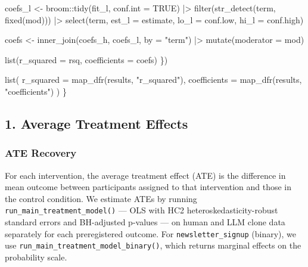 \documentclass[
  letterpaper,
  DIV=11,
  numbers=noendperiod]{scrartcl}
\newenvironment{Shaded}{\begin{snugshade}}{\end{snugshade}}
\newcommand{\AttributeTok}[1]{\textcolor[rgb]{0.40,0.45,0.13}{#1}}
\newcommand{\ConstantTok}[1]{\textcolor[rgb]{0.56,0.35,0.01}{#1}}
\newcommand{\FunctionTok}[1]{\textcolor[rgb]{0.28,0.35,0.67}{#1}}
\newcommand{\NormalTok}[1]{\textcolor[rgb]{0.00,0.23,0.31}{#1}}
\newcommand{\OtherTok}[1]{\textcolor[rgb]{0.00,0.23,0.31}{#1}}
\newcommand{\SpecialCharTok}[1]{\textcolor[rgb]{0.37,0.37,0.37}{#1}}
\newcommand{\StringTok}[1]{\textcolor[rgb]{0.13,0.47,0.30}{#1}}
\begin{document}
\begin{Shaded}
\begin{Highlighting}[]
\NormalTok{    coefs\_l }\OtherTok{\textless{}{-}}\NormalTok{ broom}\SpecialCharTok{::}\FunctionTok{tidy}\NormalTok{(fit\_l, }\AttributeTok{conf.int =} \ConstantTok{TRUE}\NormalTok{) }\SpecialCharTok{|\textgreater{}}
      \FunctionTok{filter}\NormalTok{(}\FunctionTok{str\_detect}\NormalTok{(term, }\FunctionTok{fixed}\NormalTok{(mod))) }\SpecialCharTok{|\textgreater{}}
      \FunctionTok{select}\NormalTok{(term, }\AttributeTok{est\_l =}\NormalTok{ estimate, }\AttributeTok{lo\_l =}\NormalTok{ conf.low, }\AttributeTok{hi\_l =}\NormalTok{ conf.high)}

\NormalTok{    coefs }\OtherTok{\textless{}{-}} \FunctionTok{inner\_join}\NormalTok{(coefs\_h, coefs\_l, }\AttributeTok{by =} \StringTok{"term"}\NormalTok{) }\SpecialCharTok{|\textgreater{}}
      \FunctionTok{mutate}\NormalTok{(}\AttributeTok{moderator =}\NormalTok{ mod)}

    \FunctionTok{list}\NormalTok{(}\AttributeTok{r\_squared =}\NormalTok{ rsq, }\AttributeTok{coefficients =}\NormalTok{ coefs)}
\NormalTok{  \})}

  \FunctionTok{list}\NormalTok{(}
    \AttributeTok{r\_squared    =} \FunctionTok{map\_dfr}\NormalTok{(results, }\StringTok{"r\_squared"}\NormalTok{),}
    \AttributeTok{coefficients =} \FunctionTok{map\_dfr}\NormalTok{(results, }\StringTok{"coefficients"}\NormalTok{)}
\NormalTok{  )}
\NormalTok{\}}
\end{Highlighting}
\end{Shaded}

\subsection{1. Average Treatment
Effects}\label{average-treatment-effects}

\subsubsection{ATE Recovery}\label{ate-recovery}

For each intervention, the average treatment effect (ATE) is the
difference in mean outcome between participants assigned to that
intervention and those in the control condition. We estimate ATEs by
running \texttt{run\_main\_treatment\_model()} --- OLS with HC2
heteroskedasticity-robust standard errors and BH-adjusted p-values ---
on human and LLM clone data separately for each preregistered outcome.
For \texttt{newsletter\_signup} (binary), we use
\texttt{run\_main\_treatment\_model\_binary()}, which returns marginal
effects on the probability scale.
\end{document}
